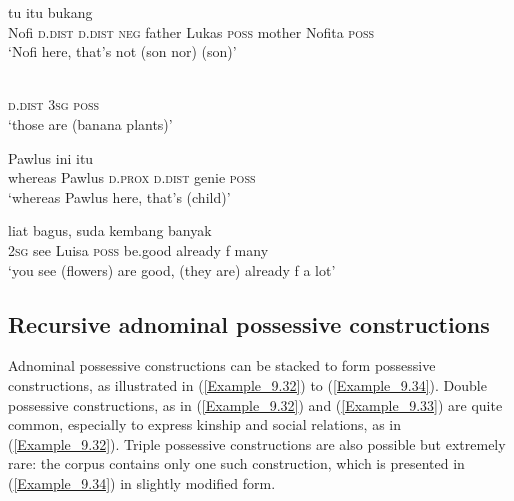 \ea
\label{Example_9.28}
 {{tu}} {{itu}} {{bukang}} {} {} {} {} {}  {}  {}  {}\\ %
 Nofi  {\textsc{d.dist}}  {\textsc{d.dist}}  {\textsc{neg}}  father  Lukas  \textsc{poss} {} {mother}  {Nofita}  {\textsc{poss}}  {} \\
\glt 
‘Nofi here, that’s not  (son nor)  (son)’ \textstyleExampleSource{[081006-024-CvEx.0011]}
\z

\ea
\label{Example_9.29}
      \\
 \textsc{d.dist}  \textsc{3sg}  \textsc{poss}  \\
\glt 
‘those are  (banana plants)’ \textstyleExampleSource{[081110-008-CvNP.0121]}
\z

\ea
\label{Example_9.30}
 {Pawlus} {ini} {itu} {} {} {}\\ %
 whereas  Pawlus  \textsc{d.prox}  \textsc{d.dist}  genie  \textsc{poss}  \\
\glt 
‘whereas Pawlus here, that’s  (child)’ \textstyleExampleSource{[081025-006-Cv.0276]}
\z

\ea
\label{Example_9.31}
 {liat} {} {} {} {bagus,} {suda} {kembang} {banyak}\\ %
 \textsc{2sg}  see  Luisa  \textsc{poss}   { }  be.good  already  f  many\\
\glt
‘you see  (flowers) are good, (they are) already f a lot’ \textstyleExampleSource{[081006-021-CvHt.0002]}
\z


\subsection[Recursive adnominal possessive constructions]{Recursive adnominal possessive constructions}
\label{Para_9.2.1.3}
Adnominal possessive constructions can be stacked to form  possessive constructions, as illustrated in (\ref{Example_9.32}) to (\ref{Example_9.34}). Double possessive constructions, as in (\ref{Example_9.32}) and (\ref{Example_9.33}) are quite common, especially to express kinship and social relations, as in (\ref{Example_9.32}). Triple possessive constructions are also possible but extremely rare: the corpus contains only one such construction, which is presented in (\ref{Example_9.34}) in slightly modified form.


